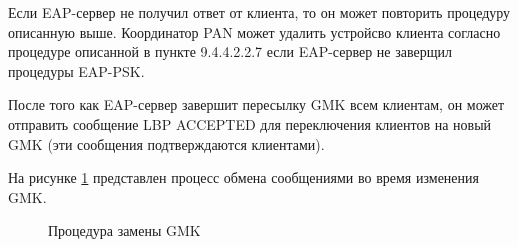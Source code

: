 Если EAP-сервер не получил ответ от клиента, то он может повторить процедуру описанную выше. Координатор PAN может удалить устройсво клиента согласно процедуре описанной в пункте 9.4.4.2.2.7 если EAP-сервер не заверщил процедуры EAP-PSK.

После того как EAP-сервер завершит пересылку GMK всем клиентам, он может отправить сообщение LBP ACCEPTED для переключения клиентов на новый GMK (эти сообщения подтверждаются клиентами).

На рисунке \ref{img:10-4} представлен процесс обмена сообщениями во время изменения GMK.

\begin{figure}[h]
\caption{Процедура замены GMK}
\label{img:10-4}
\end{figure}
